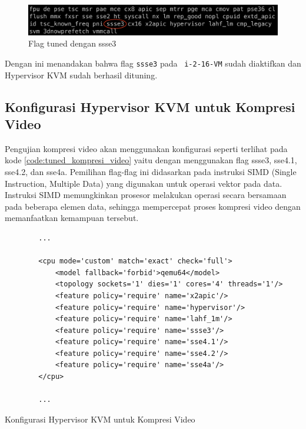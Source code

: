 \begin{figure}
    \centering
    \includegraphics[width=1\textwidth]
    {assets/pics/lscpu_ssse3.jpeg}
    \caption{Flag tuned dengan ssse3}
    \label{fig:lscpu_ssse3}
\end{figure}

Dengan ini menandakan bahwa flag \texttt{ssse3} pada \vm\ \texttt{i-2-16-VM} sudah diaktifkan dan Hypervisor KVM sudah berhasil dituning.

\subsection{Konfigurasi Hypervisor KVM untuk Kompresi Video}
Pengujian kompresi video akan menggunakan konfigurasi seperti terlihat pada kode \ref{code:tuned_kompresi_video} yaitu dengan menggunakan flag ssse3, sse4.1, sse4.2, dan sse4a. Pemilihan flag-flag ini didasarkan pada instruksi SIMD (Single Instruction, Multiple Data) yang digunakan untuk operasi vektor pada data. Instruksi SIMD memungkinkan prosesor melakukan operasi secara bersamaan pada beberapa elemen data, sehingga mempercepat proses kompresi video dengan memanfaatkan kemampuan tersebut.

\begin{listing}[H]
    \begin{verbatim}
        ...

        <cpu mode='custom' match='exact' check='full'>
            <model fallback='forbid'>qemu64</model>
            <topology sockets='1' dies='1' cores='4' threads='1'/>
            <feature policy='require' name='x2apic'/>
            <feature policy='require' name='hypervisor'/> 
            <feature policy='require' name='lahf_1m'/>
            <feature policy='require' name='ssse3'/>
            <feature policy='require' name='sse4.1'/>
            <feature policy='require' name='sse4.2'/>
            <feature policy='require' name='sse4a'/>
        </cpu>
        
        ...
    \end{verbatim}
    \caption{Konfigurasi Hypervisor KVM untuk Kompresi Video}
    \label{code:tuned_kompresi_video}
\end{listing}

